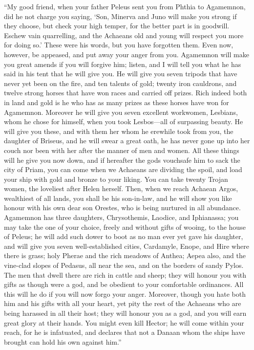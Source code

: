 “My good friend, when your father Peleus sent you from Phthia to
Agamemnon, did he not charge you saying, ‘Son, Minerva and Juno will make
you strong if they choose, but check your high temper, for the better part
is in goodwill. Eschew vain quarrelling, and the Achaeans old and young
will respect you more for doing so.’ These were his words, but you have
forgotten them. Even now, however, be appeased, and put away your anger
from you. Agamemnon will make you great amends if you will forgive him;
listen, and I will tell you what he has said in his tent that he will give
you. He will give you seven tripods that have never yet been on the fire,
and ten talents of gold; twenty iron cauldrons, and twelve strong horses
that have won races and carried off prizes. Rich indeed both in land and
gold is he who has as many prizes as these horses have won for Agamemnon.
Moreover he will give you seven excellent workwomen, Lesbians, whom he
chose for himself, when you took Lesbos—all of surpassing beauty. He
will give you these, and with them her whom he erewhile took from you, the
daughter of Briseus, and he will swear a great oath, he has never gone up
into her couch nor been with her after the manner of men and women. All
these things will he give you now down, and if hereafter the gods
vouchsafe him to sack the city of Priam, you can come when we Achaeans are
dividing the spoil, and load your ship with gold and bronze to your
liking. You can take twenty Trojan women, the loveliest after Helen
herself. Then, when we reach Achaean Argos, wealthiest of all lands, you
shall be his son-in-law, and he will show you like honour with his own
dear son Orestes, who is being nurtured in all abundance. Agamemnon has
three daughters, Chrysothemis, Laodice, and Iphianassa; you may take the
one of your choice, freely and without gifts of wooing, to the house of
Peleus; he will add such dower to boot as no man ever yet gave his
daughter, and will give you seven well-established cities, Cardamyle,
Enope, and Hire where there is grass; holy Pherae and the rich meadows of
Anthea; Aepea also, and the vine-clad slopes of Pedasus, all near the sea,
and on the borders of sandy Pylos. The men that dwell there are rich in
cattle and sheep; they will honour you with gifts as though were a god,
and be obedient to your comfortable ordinances. All this will he do if you
will now forgo your anger. Moreover, though you hate both him and his
gifts with all your heart, yet pity the rest of the Achaeans who are being
harassed in all their host; they will honour you as a god, and you will
earn great glory at their hands. You might even kill Hector; he will come
within your reach, for he is infatuated, and declares that not a Danaan
whom the ships have brought can hold his own against him.”

